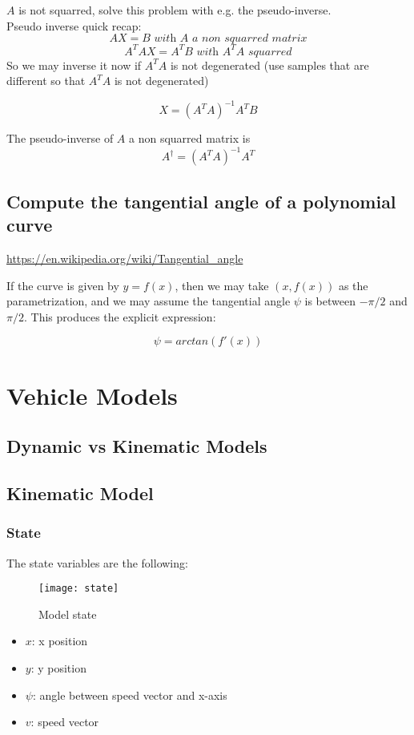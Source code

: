 \documentclass[11pt]{article}
\begin{document}
$A$ is not squarred, solve this problem with e.g. the pseudo-inverse. \\

Pseudo inverse quick recap:
$$AX=B \textit{ with A a non squarred matrix}$$
$$A^T AX=A^TB \textit{ with }A^TA \textit{ squarred}$$
So we may inverse it now if $A^TA$ is not degenerated (use samples that are  different so that $A^TA$ is not degenerated)

$$X=(A^TA)^{-1}A^TB$$

The pseudo-inverse of $A$ a non squarred matrix is
$$ A^\dagger = (A^TA)^{-1}A^T$$

\subsection{Compute the tangential angle of a polynomial curve}

\url{https://en.wikipedia.org/wiki/Tangential_angle}

If the curve is given by $y = f(x)$, then we may take $(x, f(x))$ as the parametrization, and we may assume the tangential angle $\psi$ is between $−\pi/2$ and $\pi/2$. This produces the explicit expression:

$$ \psi = arctan(f'(x))$$ 


\section{Vehicle Models}

\subsection{Dynamic vs Kinematic Models}

\subsection{Kinematic Model}

\subsubsection{State}

The state variables are the following:

\begin{figure}[h]
    \centering
    \texttt{[image: state]}
    \caption{Model state}
    \label{fig:state}
\end{figure}
\FloatBarrier

\begin{itemize}
\item $x$: x position
\item $y$: y position
\item $\psi$: angle between speed vector and x-axis
\item $v$: speed vector
\end{itemize}
\end{document}
